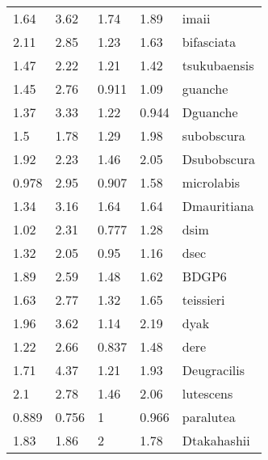 \begin{tabular}{lllll}
           1.64 &            3.62 &            1.74 &            1.89 &                   imaii \\
           2.11 &            2.85 &            1.23 &            1.63 &              bifasciata \\
           1.47 &            2.22 &            1.21 &            1.42 &            tsukubaensis \\
           1.45 &            2.76 &           0.911 &            1.09 &                 guanche \\
           1.37 &            3.33 &            1.22 &           0.944 &                Dguanche \\
            1.5 &            1.78 &            1.29 &            1.98 &              subobscura \\
           1.92 &            2.23 &            1.46 &            2.05 &             Dsubobscura \\
          0.978 &            2.95 &           0.907 &            1.58 &              microlabis \\
           1.34 &            3.16 &            1.64 &            1.64 &             Dmauritiana \\
           1.02 &            2.31 &           0.777 &            1.28 &                    dsim \\
           1.32 &            2.05 &            0.95 &            1.16 &                    dsec \\
           1.89 &            2.59 &            1.48 &            1.62 &                   BDGP6 \\
           1.63 &            2.77 &            1.32 &            1.65 &               teissieri \\
           1.96 &            3.62 &            1.14 &            2.19 &                    dyak \\
           1.22 &            2.66 &           0.837 &            1.48 &                    dere \\
           1.71 &            4.37 &            1.21 &            1.93 &             Deugracilis \\
            2.1 &            2.78 &            1.46 &            2.06 &               lutescens \\
          0.889 &           0.756 &               1 &           0.966 &               paralutea \\
           1.83 &            1.86 &               2 &            1.78 &             Dtakahashii \\

\end{tabular}
